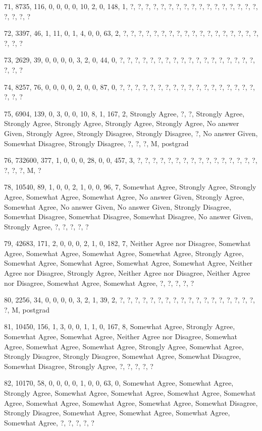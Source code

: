 \documentclass[12pt,twoside]{article}
\begin{document}
71, 8735, 116, 0, 0, 0, 0, 10, 2, 0, 148, 1, ?, ?, ?, ?, ?, ?, ?, ?, ?,
?, ?, ?, ?, ?, ?, ?, ?, ?, ?, ?, ?

72, 3397, 46, 1, 11, 0, 1, 4, 0, 0, 63, 2, ?, ?, ?, ?, ?, ?, ?, ?, ?, ?,
?, ?, ?, ?, ?, ?, ?, ?, ?, ?, ?

73, 2629, 39, 0, 0, 0, 0, 3, 2, 0, 44, 0, ?, ?, ?, ?, ?, ?, ?, ?, ?, ?,
?, ?, ?, ?, ?, ?, ?, ?, ?, ?, ?

74, 8257, 76, 0, 0, 0, 0, 2, 0, 0, 87, 0, ?, ?, ?, ?, ?, ?, ?, ?, ?, ?,
?, ?, ?, ?, ?, ?, ?, ?, ?, ?, ?

75, 6904, 139, 0, 3, 0, 0, 10, 8, 1, 167, 2, Strongly Agree, ?, ?,
Strongly Agree, Strongly Agree, Strongly Agree, Strongly Agree,
Strongly Agree, No answer Given, Strongly Agree, Strongly Disagree,
Strongly Disagree, ?, No answer Given, Somewhat Disagree, Strongly
Disagree, ?, ?, ?, M, postgrad

76, 732600, 377, 1, 0, 0, 0, 28, 0, 0, 457, 3, ?, ?, ?, ?, ?, ?, ?, ?,
?, ?, ?, ?, ?, ?, ?, ?, ?, ?, ?, M, ?

78, 10540, 89, 1, 0, 0, 2, 1, 0, 0, 96, 7, Somewhat Agree, Strongly
Agree, Strongly Agree, Somewhat Agree, Somewhat Agree, No answer Given,
Strongly Agree, Somewhat Agree, No answer Given, No answer Given,
Strongly Disagree, Somewhat Disagree, Somewhat Disagree, Somewhat
Disagree, No answer Given, Strongly Agree, ?, ?, ?, ?, ?

79, 42683, 171, 2, 0, 0, 0, 2, 1, 0, 182, 7, Neither Agree nor Disagree,
Somewhat Agree, Somewhat Agree, Somewhat Agree, Somewhat Agree,
Strongly Agree, Somewhat Agree, Somewhat Agree, Somewhat Agree,
Somewhat Agree, Neither Agree nor Disagree, Strongly Agree, Neither
Agree nor Disagree, Neither Agree nor Disagree, Somewhat Agree,
Somewhat Agree, ?, ?, ?, ?, ?

80, 2256, 34, 0, 0, 0, 0, 3, 2, 1, 39, 2, ?, ?, ?, ?, ?, ?, ?, ?, ?, ?,
?, ?, ?, ?, ?, ?, ?, ?, ?, M, postgrad

81, 10450, 156, 1, 3, 0, 0, 1, 1, 0, 167, 8, Somewhat Agree, Strongly
Agree, Somewhat Agree, Somewhat Agree, Neither Agree nor Disagree,
Somewhat Agree, Somewhat Agree, Somewhat Agree, Strongly Agree,
Somewhat Agree, Strongly Disagree, Strongly Disagree, Somewhat Agree,
Somewhat Disagree, Somewhat Disagree, Strongly Agree, ?, ?, ?, ?, ?

82, 10170, 58, 0, 0, 0, 0, 1, 0, 0, 63, 0, Somewhat Agree, Somewhat
Agree, Strongly Agree, Somewhat Agree, Somewhat Agree, Somewhat Agree,
Somewhat Agree, Somewhat Agree, Somewhat Agree, Somewhat Agree,
Somewhat Disagree, Strongly Disagree, Somewhat Agree, Somewhat Agree,
Somewhat Agree, Somewhat Agree, ?, ?, ?, ?, ?
\end{document}
